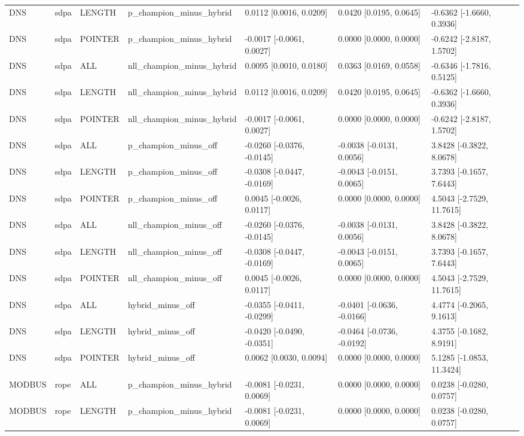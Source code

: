 \begin{tabular}{lllllll}
DNS & sdpa & LENGTH & p\_champion\_minus\_hybrid & 0.0112 [0.0016, 0.0209] & 0.0420 [0.0195, 0.0645] & -0.6362 [-1.6660, 0.3936] \\
DNS & sdpa & POINTER & p\_champion\_minus\_hybrid & -0.0017 [-0.0061, 0.0027] & 0.0000 [0.0000, 0.0000] & -0.6242 [-2.8187, 1.5702] \\
DNS & sdpa & ALL & nll\_champion\_minus\_hybrid & 0.0095 [0.0010, 0.0180] & 0.0363 [0.0169, 0.0558] & -0.6346 [-1.7816, 0.5125] \\
DNS & sdpa & LENGTH & nll\_champion\_minus\_hybrid & 0.0112 [0.0016, 0.0209] & 0.0420 [0.0195, 0.0645] & -0.6362 [-1.6660, 0.3936] \\
DNS & sdpa & POINTER & nll\_champion\_minus\_hybrid & -0.0017 [-0.0061, 0.0027] & 0.0000 [0.0000, 0.0000] & -0.6242 [-2.8187, 1.5702] \\
DNS & sdpa & ALL & p\_champion\_minus\_off & -0.0260 [-0.0376, -0.0145] & -0.0038 [-0.0131, 0.0056] & 3.8428 [-0.3822, 8.0678] \\
DNS & sdpa & LENGTH & p\_champion\_minus\_off & -0.0308 [-0.0447, -0.0169] & -0.0043 [-0.0151, 0.0065] & 3.7393 [-0.1657, 7.6443] \\
DNS & sdpa & POINTER & p\_champion\_minus\_off & 0.0045 [-0.0026, 0.0117] & 0.0000 [0.0000, 0.0000] & 4.5043 [-2.7529, 11.7615] \\
DNS & sdpa & ALL & nll\_champion\_minus\_off & -0.0260 [-0.0376, -0.0145] & -0.0038 [-0.0131, 0.0056] & 3.8428 [-0.3822, 8.0678] \\
DNS & sdpa & LENGTH & nll\_champion\_minus\_off & -0.0308 [-0.0447, -0.0169] & -0.0043 [-0.0151, 0.0065] & 3.7393 [-0.1657, 7.6443] \\
DNS & sdpa & POINTER & nll\_champion\_minus\_off & 0.0045 [-0.0026, 0.0117] & 0.0000 [0.0000, 0.0000] & 4.5043 [-2.7529, 11.7615] \\
DNS & sdpa & ALL & hybrid\_minus\_off & -0.0355 [-0.0411, -0.0299] & -0.0401 [-0.0636, -0.0166] & 4.4774 [-0.2065, 9.1613] \\
DNS & sdpa & LENGTH & hybrid\_minus\_off & -0.0420 [-0.0490, -0.0351] & -0.0464 [-0.0736, -0.0192] & 4.3755 [-0.1682, 8.9191] \\
DNS & sdpa & POINTER & hybrid\_minus\_off & 0.0062 [0.0030, 0.0094] & 0.0000 [0.0000, 0.0000] & 5.1285 [-1.0853, 11.3424] \\
MODBUS & rope & ALL & p\_champion\_minus\_hybrid & -0.0081 [-0.0231, 0.0069] & 0.0000 [0.0000, 0.0000] & 0.0238 [-0.0280, 0.0757] \\
MODBUS & rope & LENGTH & p\_champion\_minus\_hybrid & -0.0081 [-0.0231, 0.0069] & 0.0000 [0.0000, 0.0000] & 0.0238 [-0.0280, 0.0757] \\

\end{tabular}
